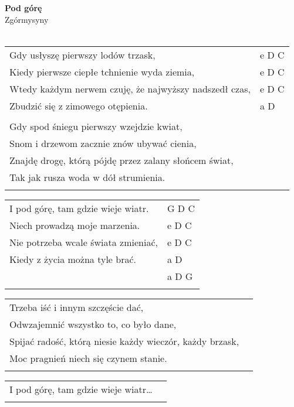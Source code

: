 \documentclass[a5paper]{article}
\begin{document}


\noindent
\fontsize{12pt}{15pt}\selectfont
\textbf{Pod górę} \\
\fontsize{8pt}{10pt}\selectfont
Zgórmysyny \\ \\
\fontsize{10pt}{12pt}\selectfont
{}
\begin{tabular}{@{}p{9.5cm}p{3cm}@{}}
\noindent
Gdy usłyszę pierwszy lodów trzask, & e D C \\
Kiedy pierwsze ciepłe tchnienie wyda ziemia, & e D C \\
Wtedy każdym nerwem czuję, że najwyższy nadszedł czas, & e D C \\
Zbudzić się z zimowego otępienia. & a D \\ \\

Gdy spod śniegu pierwszy wzejdzie kwiat, \\
Snom i drzewom zacznie znów ubywać cienia, \\
Znajdę drogę, którą pójdę przez zalany słońcem świat, \\
Tak jak rusza woda w dół strumienia. \\ \\
\end{tabular}

\noindent
\begin{tabular}{@{}p{8.5cm}p{3cm}@{}}
I pod górę, tam gdzie wieje wiatr. & G D C \\
Niech prowadzą moje marzenia. & e D C \\
Nie potrzeba wcale świata zmieniać, & e D C \\
Kiedy z życia można tyle brać. & a D \\
					& a D G \\ \\
\end{tabular}

\noindent
\begin{tabular}{@{}p{8.5cm}p{3cm}@{}}
Trzeba iść i innym szczęście dać, \\
Odwzajemnić wszystko to, co było dane, \\
Spijać radość, którą niesie każdy wieczór, każdy brzask, \\
Moc pragnień niech się czynem stanie. \\ \\
\end{tabular}

\noindent
\begin{tabular}{@{}p{8.5cm}p{3cm}@{}}
	I pod górę, tam gdzie wieje wiatr… \\ \\
\end{tabular}
\end{document}
